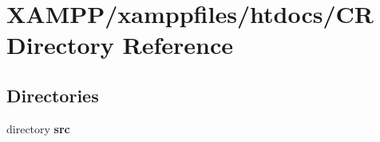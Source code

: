 \section{X\+A\+M\+P\+P/xamppfiles/htdocs/\+C\+R Directory Reference}
\label{dir_59be4695109ad613e07b844d26ead2cb}
\subsection*{Directories}
\begin{DoxyCompactItemize}
\item 
directory {\bf src}
\end{DoxyCompactItemize}
